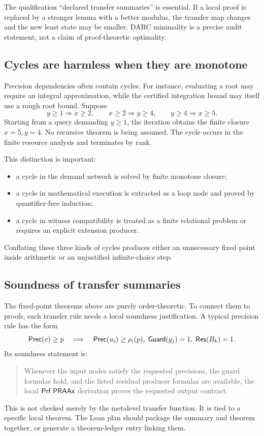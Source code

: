 The qualification ``declared transfer summaries'' is essential.  If a local
proof is replaced by a stronger lemma with a better modulus, the transfer map
changes and the new least state may be smaller.  DARC minimality is a precise
audit statement, not a claim of proof-theoretic optimality.

\subsection{Cycles are harmless when they are monotone}

Precision dependencies often contain cycles.  For instance, evaluating a
root may require an integral approximation, while the certified integration
bound may itself use a rough root bound.  Suppose
\[
  y\ge1\Rightarrow x\ge2,
  \qquad
  x\ge2\Rightarrow y\ge4,
  \qquad
  y\ge4\Rightarrow x\ge5.
\]
Starting from a query demanding \(y\ge1\), the iteration obtains the finite
closure \(x=5,y=4\).  No recursive theorem is being assumed.  The cycle occurs
in the finite resource analysis and terminates by rank.

This distinction is important:
\begin{itemize}
  \item a cycle in the demand network is solved by finite monotone closure;
  \item a cycle in mathematical execution is extracted as a loop node and
        proved by quantifier-free induction;
  \item a cycle in witness compatibility is treated as a finite relational
        problem or requires an explicit extension producer.
\end{itemize}
Conflating these three kinds of cycles produces either an unnecessary fixed
point inside arithmetic or an unjustified infinite-choice step.

\subsection{Soundness of transfer summaries}

The fixed-point theorems above are purely order-theoretic.  To connect them to
proofs, each transfer rule needs a local soundness justification.  A typical
precision rule has the form
\[
  \mathsf{Prec}(v)\ge p
  \quad\Longrightarrow\quad
  \mathsf{Prec}(u_i)\ge \rho_i(p),\;
  \mathsf{Guard}(g_j)=1,\;
  \mathsf{Res}(B_k)=1.
\]
Its soundness statement is:
\begin{quote}
Whenever the input nodes satisfy the requested precisions, the guard formulas
hold, and the listed residual producer formulas are available, the local
\(\mathsf{Prf}\;\mathsf{PRAAx}\) derivation proves the requested output contract.
\end{quote}
This is not checked merely by the metalevel transfer function.  It is tied to a
specific local theorem.  The Lean plan should package the summary and theorem
together, or generate a theorem-ledger entry linking them.

